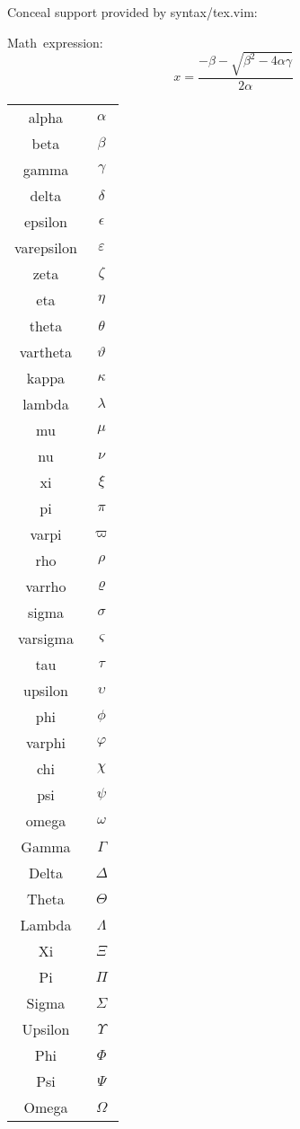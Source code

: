 \documentclass{article}
\begin{document}
Conceal support provided by syntax/tex.vim:

Math expression:
\[
x=\frac{-\beta-\sqrt{\beta^2-4\alpha\gamma}}%
       {2\alpha}%
\]


\begin{tabular}{c|c}%
    alpha & \(\alpha\)\\
    beta & \(\beta\)\\
    gamma & \(\gamma\)\\
    delta & \(\delta\)\\
    epsilon & \(\epsilon\)\\
    varepsilon & \(\varepsilon\)\\
    zeta & \(\zeta\)\\
    eta & \(\eta\)\\
    theta & \(\theta\)\\
    vartheta & \(\vartheta\)\\
    kappa & \(\kappa\)\\
    lambda & \(\lambda\)\\
    mu & \(\mu\)\\
    nu & \(\nu\)\\
    xi & \(\xi\)\\
    pi & \(\pi\)\\
    varpi & \(\varpi\)\\
    rho & \(\rho\)\\
    varrho & \(\varrho\)\\
    sigma & \(\sigma\)\\
    varsigma & \(\varsigma\)\\
    tau & \(\tau\)\\
    upsilon & \(\upsilon\)\\
    phi & \(\phi\)\\
    varphi & \(\varphi\)\\
    chi & \(\chi\)\\
    psi & \(\psi\)\\
    omega & \(\omega\)\\
    Gamma & \(\Gamma\)\\
    Delta & \(\Delta\)\\
    Theta & \(\Theta\)\\
    Lambda & \(\Lambda\)\\
    Xi & \(\Xi\)\\
    Pi & \(\Pi\)\\
    Sigma & \(\Sigma\)\\
    Upsilon & \(\Upsilon\)\\
    Phi & \(\Phi\)\\
    Psi & \(\Psi\)\\
    Omega & \(\Omega\)\\
\end{tabular}
\end{document}
